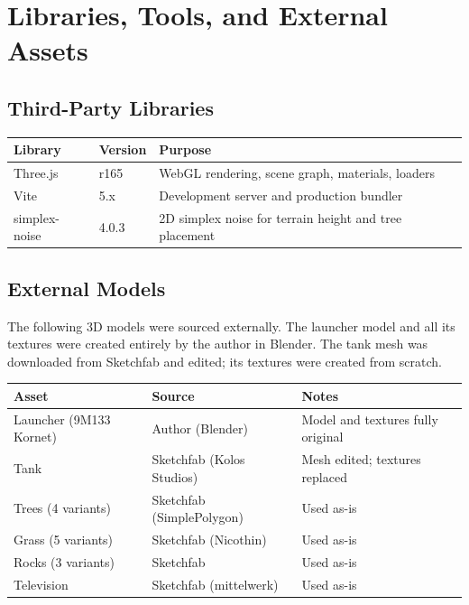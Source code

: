 \documentclass[11pt, a4paper]{article}
\begin{document}
	\section{Libraries, Tools, and External Assets}

	\subsection{Third-Party Libraries}

	\begin{center}
		\begin{tabularx}{\textwidth}{llX}
			\toprule
			\textbf{Library} & \textbf{Version} & \textbf{Purpose} \\
			\midrule
			Three.js       & r165  & WebGL rendering, scene graph, materials, loaders \\
			Vite           & 5.x   & Development server and production bundler \\
			simplex-noise  & 4.0.3 & 2D simplex noise for terrain height and tree placement \\
			\bottomrule
		\end{tabularx}
	\end{center}

	\subsection{External Models}

	The following 3D models were sourced externally. The launcher model and all its textures
	were created entirely by the author in Blender. The tank mesh was downloaded from
	Sketchfab and edited; its textures were created from scratch.

	\begin{center}
		\begin{tabularx}{\textwidth}{llX}
			\toprule
			\textbf{Asset} & \textbf{Source} & \textbf{Notes} \\
			\midrule
			Launcher (9M133 Kornet) & Author (Blender) & Model and textures fully original \\
			Tank                    & Sketchfab (Kolos Studios) & Mesh edited; textures replaced \\
			Trees (4 variants)      & Sketchfab (SimplePolygon) & Used as-is \\
			Grass (5 variants)      & Sketchfab (Nicothin)      & Used as-is \\
			Rocks (3 variants)      & Sketchfab                 & Used as-is \\
			Television              & Sketchfab (mittelwerk)    & Used as-is \\
			\bottomrule
		\end{tabularx}
	\end{center}
\end{document}
